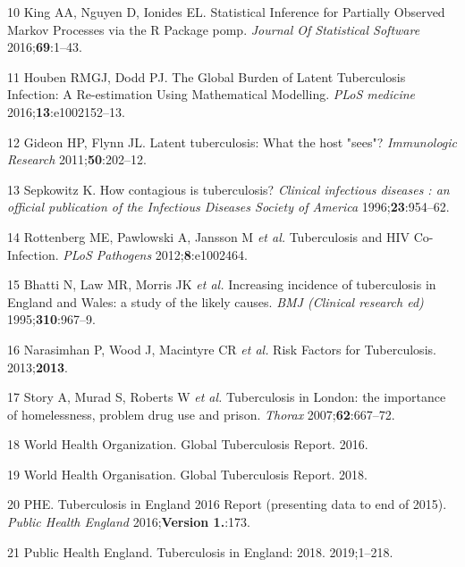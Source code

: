 \documentclass[11pt,twoside]{bristolthesis}
\begin{document}
  \leavevmode\hypertarget{ref-King2016}{}%
  10 King AA, Nguyen D, Ionides EL. Statistical Inference for Partially Observed Markov Processes via the R Package pomp. \emph{Journal Of Statistical Software} 2016;\textbf{69}:1--43.
  
  \leavevmode\hypertarget{ref-Houben:2016jp}{}%
  11 Houben RMGJ, Dodd PJ. The Global Burden of Latent Tuberculosis Infection: A Re-estimation Using Mathematical Modelling. \emph{PLoS medicine} 2016;\textbf{13}:e1002152--13.
  
  \leavevmode\hypertarget{ref-Gideon2011a}{}%
  12 Gideon HP, Flynn JL. Latent tuberculosis: What the host "sees"? \emph{Immunologic Research} 2011;\textbf{50}:202--12.
  
  \leavevmode\hypertarget{ref-Sepkowitz1996}{}%
  13 Sepkowitz K. How contagious is tuberculosis? \emph{Clinical infectious diseases : an official publication of the Infectious Diseases Society of America} 1996;\textbf{23}:954--62.
  
  \leavevmode\hypertarget{ref-Rottenberg2012}{}%
  14 Rottenberg ME, Pawlowski A, Jansson M \emph{et al.} Tuberculosis and HIV Co-Infection. \emph{PLoS Pathogens} 2012;\textbf{8}:e1002464.
  
  \leavevmode\hypertarget{ref-Bhatti1995}{}%
  15 Bhatti N, Law MR, Morris JK \emph{et al.} Increasing incidence of tuberculosis in England and Wales: a study of the likely causes. \emph{BMJ (Clinical research ed)} 1995;\textbf{310}:967--9.
  
  \leavevmode\hypertarget{ref-Narasimhan2013}{}%
  16 Narasimhan P, Wood J, Macintyre CR \emph{et al.} Risk Factors for Tuberculosis. 2013;\textbf{2013}.
  
  \leavevmode\hypertarget{ref-Story2007}{}%
  17 Story A, Murad S, Roberts W \emph{et al.} Tuberculosis in London: the importance of homelessness, problem drug use and prison. \emph{Thorax} 2007;\textbf{62}:667--72.
  
  \leavevmode\hypertarget{ref-WHOTB2016}{}%
  18 World Health Organization. Global Tuberculosis Report. 2016.
  
  \leavevmode\hypertarget{ref-WHO:2018}{}%
  19 World Health Organisation. Global Tuberculosis Report. 2018.
  
  \leavevmode\hypertarget{ref-PHE2016a}{}%
  20 PHE. Tuberculosis in England 2016 Report (presenting data to end of 2015). \emph{Public Health England} 2016;\textbf{Version 1.}:173.
  
  \leavevmode\hypertarget{ref-PHE2018}{}%
  21 Public Health England. Tuberculosis in England: 2018. 2019;1--218.
  
\end{document}
